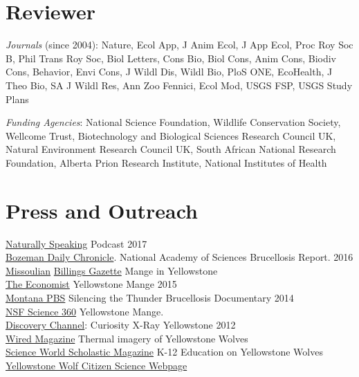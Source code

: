 \documentclass[12pt,]{article}
\begin{document}
\hypertarget{reviewer}{%
\section{Reviewer}\label{reviewer}}

\emph{Journals} (since 2004): Nature, Ecol App, J Anim Ecol, J App Ecol,
Proc Roy Soc B, Phil Trans Roy Soc, Biol Letters, Cons Bio, Biol Cons,
Anim Cons, Biodiv Cons, Behavior, Envi Cons, J Wildl Dis, Wildl Bio,
PloS ONE, EcoHealth, J Theo Bio, SA J Wildl Res, Ann Zoo Fennici, Ecol
Mod, USGS FSP, USGS Study Plans

\emph{Funding Agencies}: National Science Foundation, Wildlife
Conservation Society, Wellcome Trust, Biotechnology and Biological
Sciences Research Council UK, Natural Environment Research Council UK,
South African National Research Foundation, Alberta Prion Research
Institute, National Institutes of Health

\hypertarget{press-and-outreach}{%
\section{Press and Outreach}\label{press-and-outreach}}

\href{https://naturallyspeaking.blog/2017/04/26/episode-51-natures-greatest-theatre-ecology-and-disease-in-yellowstone/}{Naturally
Speaking} Podcast \hfill 2017\\
\href{http://www.bozemandailychronicle.com/news/environment/report-elk-greater-brucellosis-transmission-risk-than-bison/article_8329c551-18a2-50a5-9352-f585935a7d99.html}{Bozeman
Daily Chronicle}. National Academy of Sciences Brucellosis Report.
\hfill 2016\\
\href{https://missoulian.com/news/state-and-regional/disease-s-spread-blamed-on-elk-not-bison-or-feed/article_379e198f-190b-562a-bd6d-950fbed46f71.html}{Missoulian}
\href{https://billingsgazette.com/lifestyles/recreation/mange-changes-yellowstone-wolves-hunting-travel-and-food-needs/article_f876b43f-3e46-5d78-b6e5-ed5e8ddddbdb.html}{Billings
Gazette} Mange in Yellowstone\\
\href{http://www.economist.com/news/science-and-technology/21652259-wolves-yellowstone-provide-some-surprising-survival-lessons-pack-power}{The
Economist} Yellowstone Mange \hfill 2015\\
\href{https://vimeo.com/104296498}{Montana PBS} Silencing the Thunder
Brucellosis Documentary \hfill 2014\\
\href{https://science360.gov/obj/video/0f50aca7-2691-4126-996f-8ec5b74a9eb0/understanding-ecological-role-wolves-yellowstone-national-park}{NSF
Science 360} Yellowstone Mange.\\
\href{http://store.discoveryeducation.com/product/show/129481}{Discovery
Channel}: Curiosity X-Ray Yellowstone \hfill 2012\\
\href{https://www.wired.com/2012/05/st_photo_wolves/}{Wired Magazine}
Thermal imagery of Yellowstone Wolves\\
\href{http://scienceworld.scholastic.com/issues/09_17_12}{Science World
Scholastic Magazine} K-12 Education on Yellowstone Wolves\\
\href{http://www.yellowstonewolf.org}{Yellowstone Wolf Citizen Science
Webpage}
\end{document}
